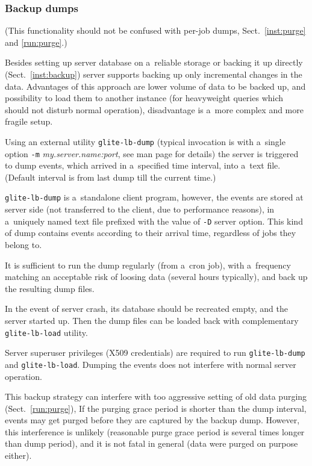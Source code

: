 \subsubsection{Backup dumps}

(This functionality should not be confused with per-job dumps, Sect.~\ref{inst:purge} and \ref{run:purge}.)

Besides setting up \LB server database on a~reliable storage or
backing it up directly (Sect.~\ref{inst:backup})
\LB server supports backing up only incremental changes in the data.
Advantages of this approach are lower volume of data to be backed up,
and possibility to load them to another instance (\eg for heavyweight
queries which should not disturb normal operation), disadvantage is
a~more complex and more fragile setup. 

Using an external utility \verb'glite-lb-dump' (typical invocation is with
a~single option \verb'-m' \emph{my.server.name:port}, see man page for
details) the server is triggered to dump events, which arrived in
a~specified time interval, into a~text file. (Default interval is from last
dump till the current time.)

\verb'glite-lb-dump' is a~standalone client program, however, 
the events are stored at server side (\ie not transferred to the client,
due to performance reasons),
in a~uniquely named text
file prefixed with the value of \verb'-D' server option. This kind of dump
contains events according to their arrival time, regardless of jobs they belong
to.

It is sufficient to run the dump regularly (from a~cron job), with a~frequency
matching an acceptable risk of loosing data (several hours typically), and back
up the resulting dump files. 

In the event of server crash, its database should be recreated empty,
and the server started up.
Then the dump files can be loaded back with complementary
\verb'glite-lb-load' utility.

Server superuser privileges (X509 credentials) are required to run \verb'glite-lb-dump' and \verb'glite-lb-load'.
Dumping the events does not interfere with normal server operation.

This backup strategy can interfere with too aggressive setting of old
data purging (Sect.~\ref{run:purge}), 
If the purging grace period is shorter than the dump interval,
events may get purged before they are captured by the backup dump.
However, this interference is unlikely (reasonable purge grace period
is several times longer than dump period),
and it is not fatal in general (data were purged on purpose either).

